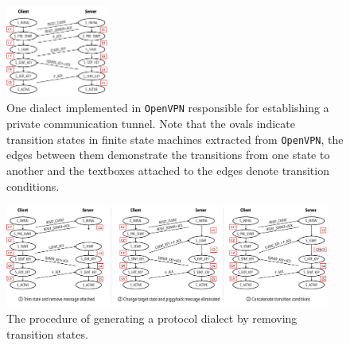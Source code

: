 \begin{figure}
  \centering
  \includegraphics[width=0.3\textwidth]{figure/dialect}
  \caption{One dialect implemented in \texttt{OpenVPN} responsible for
  establishing a private communication tunnel. Note that the ovals indicate
  transition states in finite state machines extracted from \texttt{OpenVPN},
  the edges between them demonstrate the transitions from one state to another
  and the textboxes attached to the edges denote transition conditions.}  
  \label{fig:original_dialect}
\end{figure}


\begin{figure}[t]
\centering
\includegraphics[width=0.95\textwidth]{figure/state_removal}
\caption{The procedure of generating a protocol dialect by removing transition 
states.} 
\vspace{-0.1in} 
\label{fig:state_removal} 
\end{figure} 

